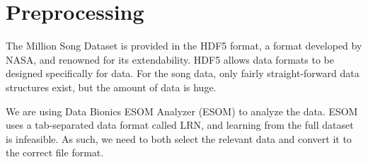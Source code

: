 \section{Preprocessing} %
\label{sec:preprocessing}

The Million Song Dataset is provided in the HDF5 format, a format developed by NASA, and renowned for its extendability. HDF5
allows data formats to be designed specifically for data. For the song data, only fairly straight-forward data structures exist,
but the amount of data is huge.

We are using Data Bionics ESOM Analyzer (ESOM) to analyze the data. ESOM uses a tab-separated data format called LRN, and learning
from the full dataset is infeasible. As such, we need to both select the relevant data and convert it to the correct file format.



